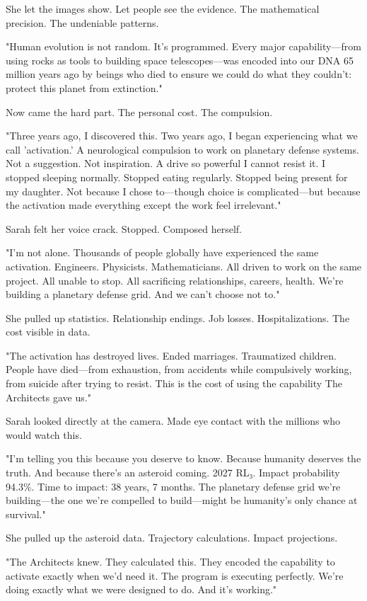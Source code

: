 She let the images show. Let people see the evidence. The mathematical precision. The undeniable patterns.

"Human evolution is not random. It's programmed. Every major capability—from using rocks as tools to building space telescopes—was encoded into our DNA 65 million years ago by beings who died to ensure we could do what they couldn't: protect this planet from extinction."

Now came the hard part. The personal cost. The compulsion.

"Three years ago, I discovered this. Two years ago, I began experiencing what we call 'activation.' A neurological compulsion to work on planetary defense systems. Not a suggestion. Not inspiration. A drive so powerful I cannot resist it. I stopped sleeping normally. Stopped eating regularly. Stopped being present for my daughter. Not because I chose to—though choice is complicated—but because the activation made everything except the work feel irrelevant."

Sarah felt her voice crack. Stopped. Composed herself.

"I'm not alone. Thousands of people globally have experienced the same activation. Engineers. Physicists. Mathematicians. All driven to work on the same project. All unable to stop. All sacrificing relationships, careers, health. We're building a planetary defense grid. And we can't choose not to."

She pulled up statistics. Relationship endings. Job losses. Hospitalizations. The cost visible in data.

"The activation has destroyed lives. Ended marriages. Traumatized children. People have died—from exhaustion, from accidents while compulsively working, from suicide after trying to resist. This is the cost of using the capability The Architects gave us."

Sarah looked directly at the camera. Made eye contact with the millions who would watch this.

"I'm telling you this because you deserve to know. Because humanity deserves the truth. And because there's an asteroid coming. 2027 RL₃. Impact probability 94.3\%. Time to impact: 38 years, 7 months. The planetary defense grid we're building—the one we're compelled to build—might be humanity's only chance at survival."

She pulled up the asteroid data. Trajectory calculations. Impact projections.

"The Architects knew. They calculated this. They encoded the capability to activate exactly when we'd need it. The program is executing perfectly. We're doing exactly what we were designed to do. And it's working."

